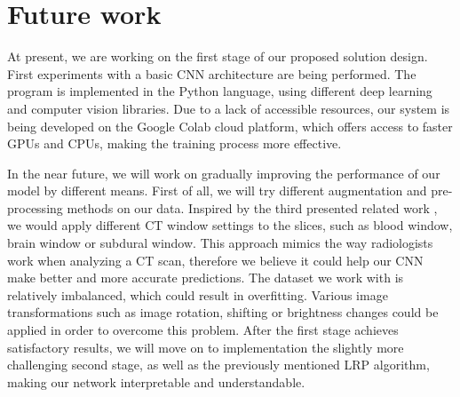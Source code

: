 \section{Future work}
At present, we are working on the first stage of our proposed solution design. First experiments with a basic CNN architecture are being performed. The program is implemented in the Python language, using different deep learning and computer vision libraries. Due to a lack of accessible resources, our system is being developed on the Google Colab cloud platform, which offers access to faster GPUs and CPUs, making the training process more effective.


In the near future, we will work on gradually improving the performance of our model by different means. First of all, we will try different augmentation and pre-processing methods on our data. Inspired by the third presented related work \cite{relatedWork3}, we would apply different CT window settings to the slices, such as blood window, brain window or subdural window. This approach mimics the way radiologists work when analyzing a CT scan, therefore we believe it could help our CNN make better and more accurate predictions. The dataset we work with is relatively imbalanced, which could result in overfitting. Various image transformations such as image rotation, shifting or brightness changes could be applied in order to overcome this problem. After the first stage achieves satisfactory results, we will move on to implementation the slightly more challenging second stage, as well as the previously mentioned LRP algorithm, making our network interpretable and understandable.
